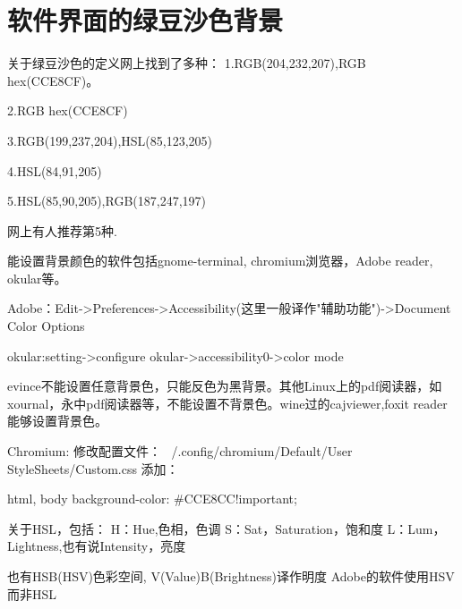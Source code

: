 \section{软件界面的绿豆沙色背景}
关于绿豆沙色的定义网上找到了多种：
1.RGB(204,232,207),RGB hex(CCE8CF)。

2.RGB hex(CCE8CF)

3.RGB(199,237,204),HSL(85,123,205)

4.HSL(84,91,205)

5.HSL(85,90,205),RGB(187,247,197)

网上有人推荐第5种.

能设置背景颜色的软件包括gnome-terminal, chromium浏览器，Adobe reader, okular等。


Adobe：Edit->Preferences->Accessibility(这里一般译作"辅助功能")->Document Color Options

okular:setting->configure okular->accessibility0->color mode

evince不能设置任意背景色，只能反色为黑背景。其他Linux上的pdf阅读器，如xournal，永中pdf阅读器等，不能设置不背景色。wine过的cajviewer,foxit reader能够设置背景色。



Chromium:
修改配置文件：
~/.config/chromium/Default/User StyleSheets/Custom.css
添加：
\begin{shellcmd}
html, body {background-color: #CCE8CC!important;}
\end{shellcmd}



关于HSL，包括：
H：Hue,色相，色调
S：Sat，Saturation，饱和度
L：Lum，Lightness,也有说Intensity，亮度

也有HSB(HSV)色彩空间,
V(Value)B(Brightness)译作明度
Adobe的软件使用HSV而非HSL
